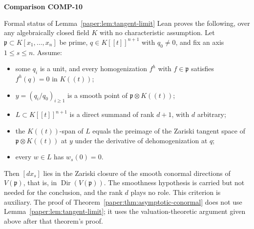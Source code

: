 \documentclass[11pt]{amsart}
\numberwithin{equation}{section}
\theoremstyle{plain}
\theoremstyle{remark}
\newcommand{\Dir}{\operatorname{Dir}}
\begin{document}
\par\bigskip\noindent{}\hypertarget{comparison-COMP-10}{\textbf{Comparison COMP-10}}\label{comparison-COMP-10}\par\smallskip
{}
\begin{AIaddition}{Formal status of Lemma~\ref{paper:lem:tangent-limit}}
Lean proves the following, over any algebraically closed field $K$ with no
characteristic assumption. Let $\mathfrak p\subset K[x_1,\dots,x_n]$ be prime,
$q\in K[[t]]^{n+1}$ with $q_0\neq0$, and fix an axis $1\le s\le n$. Assume:
\begin{itemize}[leftmargin=*]
\item some $q_i$ is a unit, and every homogenization $f^h$ with $f\in\mathfrak p$ satisfies $f^h(q)=0$ in $K((t))$;
\item $y=(q_i/q_0)_{i\ge1}$ is a smooth point of $\mathfrak p\otimes K((t))$;
\item $L\subset K[[t]]^{n+1}$ is a direct summand of rank $d+1$, with $d$ arbitrary;
\item the $K((t))$-span of $L$ equals the preimage of the Zariski tangent space of $\mathfrak p\otimes K((t))$ at $y$ under the derivative of dehomogenization at $q$;
\item every $w\in L$ has $w_s(0)=0$.
\end{itemize}
Then $[dx_s]$ lies in the Zariski closure of the smooth conormal directions of $V(\mathfrak p)$, that is, in $\Dir(V(\mathfrak p))$.
The smoothness hypothesis is carried but not needed for the conclusion, and the
rank $d$ plays no role. This criterion is auxiliary. The proof of
Theorem~\ref{paper:thm:asymptotic-conormal} does not use
Lemma~\ref{paper:lem:tangent-limit}; it uses the valuation-theoretic argument
given above after that theorem's proof.
\end{AIaddition}
\end{document}
